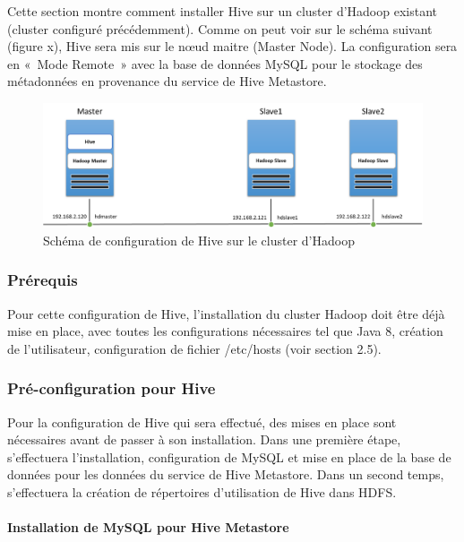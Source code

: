 \documentclass[12pt,english]{book}
\begin{document}
Cette section montre comment installer Hive sur un cluster d’Hadoop existant (cluster configuré précédemment). Comme on peut voir sur le schéma suivant (figure x), Hive sera mis sur le nœud maitre (Master Node). La configuration sera en « Mode Remote » avec la base de données MySQL pour le stockage des métadonnées en provenance du service de Hive Metastore.

\begin{figure}[H]
	\centering
	\includegraphics[width=\linewidth]{hiveCluster}
	\caption{Schéma de configuration de Hive sur le cluster d'Hadoop}
\end{figure}

\subsubsection{Prérequis}

Pour cette configuration de Hive, l’installation du cluster Hadoop doit être déjà mise en place, avec toutes les configurations nécessaires tel que Java 8, création de l’utilisateur, configuration de fichier /etc/hosts (voir section 2.5).

\subsubsection{Pré-configuration pour Hive}

Pour la configuration de Hive qui sera effectué, des mises en place sont nécessaires avant de passer à son installation.
Dans une première étape, s’effectuera l’installation, configuration de MySQL et mise en place de la base de données pour les données du service de Hive Metastore.
Dans un second temps, s’effectuera la création de répertoires d’utilisation de Hive dans HDFS.

\paragraph{Installation de MySQL pour Hive Metastore}\mbox{}\\
\end{document}
